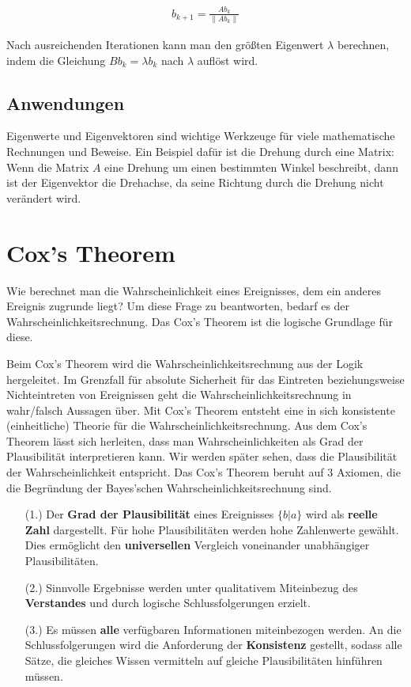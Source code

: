 \documentclass[]{dsadokumentation}
\begin{document}
\begin{equation}
  \begin{aligned}
    b_{k+1} = \frac{Ab_k}{\left\lVert Ab_k \right\rVert }
  \end{aligned}
\end{equation}

Nach ausreichenden Iterationen kann man den größten Eigenwert $\lambda$ berechnen, indem die Gleichung $B b_{k} = \lambda b_{k}$ nach $\lambda$ auflöst wird.


\subsection{Anwendungen}

Eigenwerte und Eigenvektoren sind wichtige Werkzeuge für viele mathematische Rechnungen und Beweise. Ein Beispiel dafür ist die Drehung durch eine Matrix: Wenn die Matrix $A$ eine Drehung um einen bestimmten Winkel beschreibt, dann ist der Eigenvektor die Drehachse, da seine Richtung durch die Drehung nicht verändert wird.

\section{Cox's Theorem}
Wie berechnet man die Wahrscheinlichkeit eines Ereignisses, dem ein anderes Ereignis zugrunde liegt? Um diese Frage zu beantworten, bedarf es der Wahrscheinlichkeitsrechnung. Das Cox's Theorem ist die logische Grundlage für diese.


Beim Cox's Theorem wird die Wahrscheinlichkeitsrechnung aus der Logik hergeleitet. Im Grenzfall für absolute Sicherheit für das Eintreten beziehungsweise Nichteintreten von Ereignissen geht die Wahrscheinlichkeitsrechnung in wahr/falsch Aussagen über. Mit Cox's Theorem entsteht eine in sich konsistente (einheitliche) Theorie für die Wahrscheinlichkeitsrechnung.
Aus dem Cox's Theorem lässt sich herleiten, dass man Wahrscheinlichkeiten als Grad der Plausibilität interpretieren kann. Wir werden später sehen, dass die Plausibilität der Wahrscheinlichkeit entspricht.
Das Cox's Theorem beruht auf 3 Axiomen, die die Begründung der Bayes'schen Wahrscheinlichkeitsrechnung sind.


\begin{itemize}
  \item[(1.)] Der \textbf{Grad der Plausibilität} eines Ereignisses $\{b|a\}$ wird als \textbf {reelle Zahl} dargestellt. Für hohe Plausibilitäten werden hohe Zahlenwerte gewählt. Dies ermöglicht den \textbf{universellen} Vergleich voneinander unabhängiger Plausibilitäten.

  \item[(2.)] Sinnvolle Ergebnisse werden unter qualitativem Miteinbezug des \textbf {Verstandes} und durch logische Schlussfolgerungen erzielt.
  \item[(3.)] Es müssen \textbf{alle} verfügbaren Informationen miteinbezogen werden. An die Schlussfolgerungen wird die Anforderung der \textbf{Konsistenz} gestellt, sodass alle Sätze, die gleiches Wissen vermitteln auf gleiche Plausibilitäten hinführen müssen.
\end{itemize}
\end{document}
